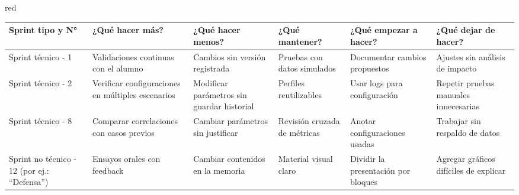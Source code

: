 \documentclass[
11pt, %
]{charter}
\begin{document}
\begin{consigna}{red}
\begin{table}[htpb]
\renewcommand{\arraystretch}{1.4}
\begin{tabular}{|>{\raggedright\arraybackslash}p{1.8cm}|
                >{\raggedright\arraybackslash}p{2.3cm}|
                >{\raggedright\arraybackslash}p{2.3cm}|
                >{\raggedright\arraybackslash}p{2.3cm}|
                >{\raggedright\arraybackslash}p{2.3cm}|
                >{\raggedright\arraybackslash}p{2.3cm}|}
\hline
\rowcolor[HTML]{CCCCCC} 
\textbf{Sprint tipo y N°} & \textbf{¿Qué hacer más?} & \textbf{¿Qué hacer menos?} & \textbf{¿Qué mantener?} & \textbf{¿Qué empezar a hacer?} & \textbf{¿Qué dejar de hacer?} \\
\hline
Sprint técnico - 1 & Validaciones continuas con el alumno & Cambios sin versión registrada & Pruebas con datos simulados & Documentar cambios propuestos & Ajustes sin análisis de impacto \\
\hline
Sprint técnico - 2 & Verificar configuraciones en múltiples escenarios & Modificar parámetros sin guardar historial & Perfiles reutilizables & Usar logs para configuración & Repetir pruebas manuales innecesarias \\
\hline
Sprint técnico - 8 & Comparar correlaciones con casos previos & Cambiar parámetros sin justificar & Revisión cruzada de métricas & Anotar configuraciones usadas & Trabajar sin respaldo de datos \\
\hline
Sprint no técnico - 12 (por ej.: ``Defensa'') & Ensayos orales con feedback & Cambiar contenidos en la memoria & Material visual claro & Dividir la presentación por bloques & Agregar gráficos difíciles de explicar \\
\hline
\end{tabular}
\end{table}

\end{consigna} %
\end{document}
